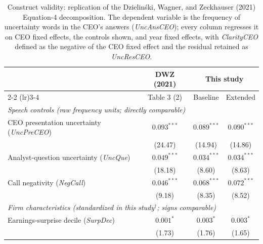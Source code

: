 \begin{table}[htbp]
\centering
\caption{Construct validity: replication of the Dzielin\'ski, Wagner, and Zeckhauser (2021) Equation-4 decomposition. The dependent variable is the frequency of uncertainty words in the CEO's answers (\textit{UncAnsCEO}); every column regresses it on CEO fixed effects, the controls shown, and year fixed effects, with \textit{ClarityCEO} defined as the negative of the CEO fixed effect and the residual retained as \textit{UncResCEO}.}
\label{tab:dwz_replication}
\small
\begin{tabular}{lccc}
\toprule
 & DWZ (2021) & \multicolumn{2}{c}{This study} \\
\cmidrule(lr){2-2} \cmidrule(lr){3-4}
 & Table 3 (2) & Baseline & Extended \\
\midrule
\multicolumn{4}{l}{\textit{Speech controls (raw frequency units; directly comparable)}} \\
\midrule
CEO presentation uncertainty (\textit{UncPreCEO}) & $0.093^{***}$ & $0.089^{***}$ & $0.090^{***}$ \\
 & (24.47) & (14.94) & (14.86) \\
Analyst-question uncertainty (\textit{UncQue}) & $0.049^{***}$ & $0.034^{***}$ & $0.034^{***}$ \\
 & (18.18) & (8.60) & (8.63) \\
Call negativity (\textit{NegCall}) & $0.046^{***}$ & $0.068^{***}$ & $0.072^{***}$ \\
 & (9.18) & (8.35) & (8.52) \\
\midrule
\multicolumn{4}{l}{\textit{Firm characteristics (standardized in this study$^{\dagger}$; signs comparable)}} \\
\midrule
Earnings-surprise decile (\textit{SurpDec}) & $0.001^{*}$ & $0.003^{*}$ & $0.003^{*}$ \\
 & (1.73) & (1.76) & (1.65) \\

\end{tabular}
\end{table}
